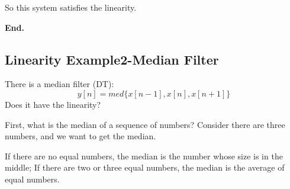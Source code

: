     So this system satisfies the linearity.

    \noindent \textbf{End.}

    \subsection{Linearity Example2-Median Filter}
    There is a median filter (DT):
        \begin{equation}
            y[n] = med\{x[n-1],x[n],x[n+1]\}
        \end{equation}
    Does it have the linearity?

    First, what is the median of a sequence of numbers? 
    Consider there are three numbers, and we want to get the median.

    If there are no equal numbers, the median is the number whose size is in the middle;
    If there are two or three equal numbers, the median is the average of equal numbers.

